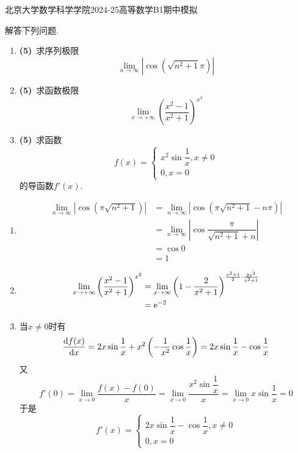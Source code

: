 \documentclass{ctexart}
\begin{document}
\pagestyle{empty}
\begin{center}\Large
    北京大学数学科学学院2024-25高等数学B1期中模拟
\end{center}
\begin{problem}[1.(15\songti{分})]
    解答下列问题.
    \begin{enumerate}[label=\textbf{(\arabic*)}]
        \item \textbf{(5)}\ 求序列极限$$\lim_{n\to\infty}\left|\cos\left(\sqrt{n^2+1}\pi\right)\right|$$
        \item \textbf{(5)}\ 求函数极限$$\lim_{x\to+\infty}\left(\dfrac{x^2-1}{x^2+1}\right)^{x^2}$$
        \item \textbf{(5)}\ 求函数$$f(x)=\left\{\begin{array}{l}x^2\sin\dfrac{1}{x},x\neq 0\\0,x=0\end{array}\right.$$的导函数$f'(x)$.
    \end{enumerate}
\end{problem}
\begin{solution}
    \begin{enumerate}[label=\textbf{(\arabic*)}]
        \item $$\begin{aligned}
                \lim_{n\to\infty}\left|\cos\left(\pi\sqrt{n^2+1}\right)\right|
                &= \lim_{n\to\infty}\left|\cos\left(\pi\sqrt{n^2+1}-n\pi\right)\right| \\
                &= \lim_{n\to\infty}\left|\cos\dfrac{\pi}{\sqrt{n^2+1}+n}\right| \\
                &= \cos 0 \\
                &= 1
            \end{aligned}$$
        \item $$\begin{aligned}
                \lim_{x\to+\infty}\left(\dfrac{x^2-1}{x^2+1}\right)^{x^2}
                &= \lim_{x\to\infty}\left(1-\dfrac{2}{x^2+1}\right)^{\frac{x^2+1}{2}\cdot\frac{2x^2}{x^2+1}} \\
                &= \mathrm{e}^{-2}
            \end{aligned}$$
        \item 当$x\neq0$时有
            $$\dfrac{\mathrm{d} f(x)}{\mathrm{d} x}=2x\sin\dfrac{1}{x}+x^2\left(-\dfrac{1}{x^2}\cos\dfrac{1}{x}\right)=2x\sin\dfrac{1}{x}-\cos\dfrac{1}{x}$$
            又$$f'(0)=\lim_{x\to0}\dfrac{f(x)-f(0)}{x}=\lim_{x\to0}\dfrac{x^2\sin\dfrac{1}{x}}{x}=\lim_{x\to0}x\sin\dfrac{1}{x}=0$$
            于是$$f'(x)=\left\{\begin{array}{l}
                2x\sin\dfrac{1}{x}-\cos\dfrac{1}{x},x\neq0\\0,x=0
            \end{array}\right.$$
    \end{enumerate}
\end{solution}
\end{document}

